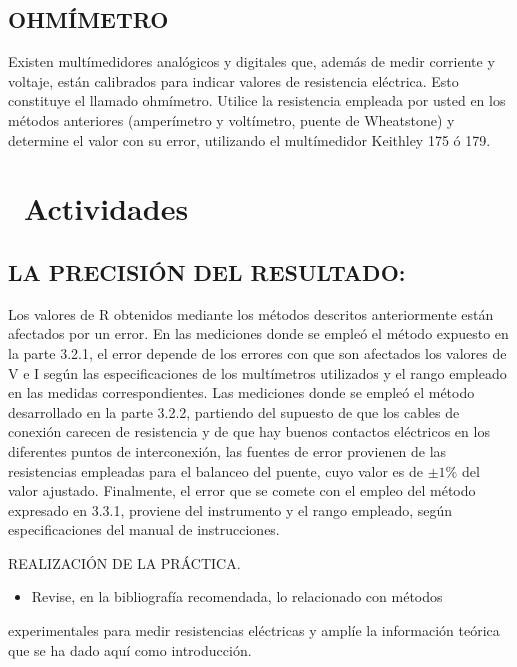 \documentclass[11pt,a4paper]{article}
\newcommand{\iconotexto}[2]{\textcolor{cyanNeon}{\faIcon{#1}}~#2}
\begin{document}
\subsection*{OHMÍMETRO}

Existen multímedidores analógicos y digitales que, además de medir corriente y voltaje, están calibrados para indicar valores de resistencia eléctrica. Esto constituye el llamado ohmímetro. Utilice la resistencia empleada por usted en los métodos anteriores (amperímetro y voltímetro, puente de Wheatstone) y determine el valor con su error, utilizando el multímedidor Keithley 175 ó 179.

\section{\iconotexto{calculator}{Actividades}}

\subsection*{LA PRECISIÓN DEL RESULTADO:}

Los valores de R obtenidos mediante los métodos descritos anteriormente están afectados por un error. En las mediciones donde se empleó el método expuesto en la parte 3.2.1, el error depende de los errores con que son afectados los valores de V e I según las especificaciones de los multímetros utilizados y el rango empleado en las medidas correspondientes. Las mediciones donde se empleó el método desarrollado en la parte 3.2.2, partiendo del supuesto de que los cables de conexión carecen de resistencia y de que hay buenos contactos eléctricos en los diferentes puntos de interconexión, las fuentes de error provienen de las resistencias empleadas para el balanceo del puente, cuyo valor es de $\pm 1\%$ del valor ajustado. Finalmente, el error que se comete con el empleo del método expresado en 3.3.1, proviene del instrumento y el rango empleado, según especificaciones del manual de instrucciones.

REALIZACIÓN DE LA PRÁCTICA.

\begin{itemize}[leftmargin=1.4em,itemsep=2pt,topsep=3pt]
  \item Revise, en la bibliografía recomendada, lo relacionado con métodos
\end{itemize}

experimentales para medir resistencias eléctricas y amplíe la información teórica que se ha dado aquí como introducción.
\end{document}
